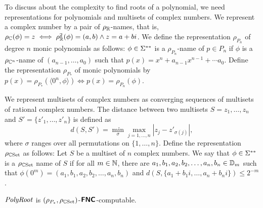 \documentclass[envcountsame,orivec,oribibl]{llncs}
\begin{document}
To discuss about the complexity to find roots of a polynomial,
we need representations for polynomials and multisets of complex numbers.
We represent a complex number by a pair of $\rho _\mathbb R$-names,
that is, $\rho_\mathbb C(\phi) = z \iff \rho_\mathbb R^2(\phi) = (a, b) \wedge z = a+bi$.
We define the representation $\rho_{P_n}$ of degree $n$ monic polynomials as follows: 
$\phi \in \Sigma ^{**}$ is a $\rho_{P_n}$-name of $p \in P_n$ 
if $\phi$ is a $\rho_{\mathbb C^n}$-name of $(a_{n-1}, \dots, a_0)$ 
such that $p(x) = x^n + a_{n-1}x^{n-1} + \cdots a_0$.
Define the representation $\rho_{P_*}$ of monic polynomials by
$p(x) = \rho_{P_*}(\langle 0^n, \phi \rangle) \iff p(x) = \rho_{P_n}(\phi)$.

We represent multisets of complex numbers as converging sequences of 
multisets of rational complex numbers.
The distance between two multisets $S = {z_1, \dots, z_n}$
and $S' = \{z'_1, \dots, z'_n\}$ is defined as
\begin{equation}
d(S, S') = \min_{\sigma} \max_{j = 1, \ldots, n}|z_j - z'_{\sigma(j)}|,
\end{equation}
where $\sigma$ ranges over all permutations on $\{1, \ldots, n\}$. 
Define the representation $\rho_{\mathbb C\mathrm{Set}}$ as follows:
Let $S$ be a multiset of $n$ complex numbers. 
We say that $\phi \in \Sigma ^{**}$ is a $\rho_{\mathbb C\mathrm{Set}}$ name of $S$ if
for all $m \in \mathbb N$, there are $a_1, b_1, a_2, b_2, \dots, a_n, b_n \in \mathbb D_m$
such that $\phi(0^m) = ( a_1, b_1, a_2, b_2, \dots, a_n, b_n )$
and $d(S, \{a_1 + b_1 i, \dots, a_n + b_n i\}) \le 2^{-m}$.


\begin{theorem}
 \label{theorem:finding-roots-is-in-NC}
 $\mathit{PolyRoot}$ is $(\rho_{P_*}, \rho_{\mathbb C\mathrm{Set}})$-$\text{\bfseries \sffamily \upshape FNC}$-computable.
\end{theorem}
\end{document}
